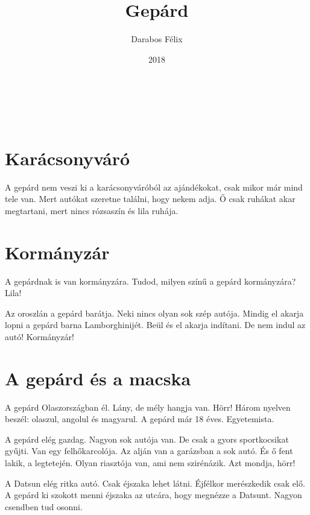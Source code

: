 \documentclass[12pt]{memoir}
\author{Darabos Félix}
\date{2018}
\title{Gepárd}
\newcommand{\image}[1]{%
\incgraph[documentpaper][keepaspectratio=true,width=\paperwidth,height=\paperheight]{#1}}
\begin{document}
\begin{titlingpage}
  \centering
  \vspace*{0.2\textheight}
  {\fontsize{80pt}{96pt}\playfair \thetitle}\\[\baselineskip]
  {\large\theauthor}\\[\baselineskip]
  \vfill
  {\thedate}
  \vspace*{0.1\textheight}
\end{titlingpage}

\pagestyle{plain}


\cleartoverso
\section{Karácsonyváró}
A gepárd nem veszi ki a karácsonyváróból az ajándékokat, csak mikor már mind
tele van. Mert autókat szeretne találni, hogy nekem adja. Ő csak ruhákat akar
megtartani, mert nincs rózsaszín és lila ruhája.
\image{karácsonyváró.png}


\section{Kormányzár}
A gepárdnak is van kormányzára. Tudod, milyen színű a gepárd kormányzára? Lila!

Az oroszlán a gepárd barátja. Neki nincs olyan sok szép autója. Mindig el
akarja lopni a gepárd barna Lamborghinijét. Beül és el akarja indítani. De nem
indul az autó! Kormányzár!
\cleartoverso


\section{A gepárd és a macska}
A gepárd Olaszországban él. Lány, de mély hangja van. Hörr! Három nyelven
beszél: olaszul, angolul és magyarul. A gepárd már 18 éves. Egyetemista.

A gepárd elég gazdag. Nagyon sok autója van. De csak a gyors sportkocsikat
gyűjti. Van egy felhőkarcolója. Az alján van a garázsban a sok autó. És ő fent
lakik, a legtetején. Olyan riasztója van, ami nem szirénázik. Azt mondja, hörr!

A Datsun elég ritka autó. Csak éjszaka lehet látni. Éjfélkor merészkedik csak
elő. A gepárd ki szokott menni éjszaka az utcára, hogy megnézze a Datsunt.
Nagyon csendben tud osonni.
\end{document}
